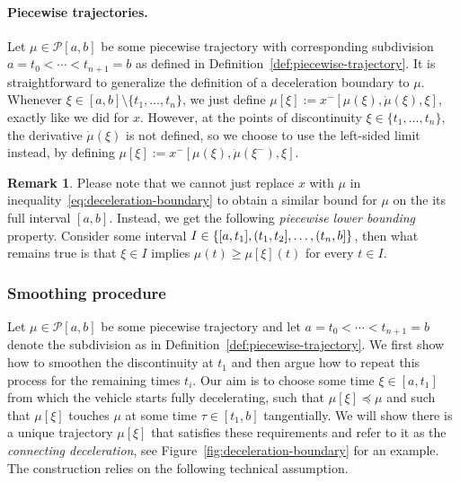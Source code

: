 \documentclass[a4paper]{article}
\theoremstyle{definition}
\newtheorem{remark}{Remark}
\theoremstyle{plain}
\begin{document}
\paragraph{Piecewise trajectories.}
Let $\mu \in \mathcal{P}[a, b]$ be some piecewise trajectory with corresponding
subdivision $a = t_{0} < \cdots < t_{n+1} = b$ as defined in Definition~\ref{def:piecewise-trajectory}. It is
straightforward to generalize the definition of a deceleration boundary to $\mu$.
%
Whenever $\xi \in [a,b] \setminus \{ t_{1}, \dots, t_{n}\}$, we just define
$\mu[\xi] := x^{-}[\mu(\xi), \dot{\mu}(\xi), \xi]$, exactly like we did for $x$.
%
However, at the points of discontinuity $\xi \in \{ t_{1}, \dots, t_{n}\}$, the
derivative $\dot{\mu}(\xi)$ is not defined, so we choose to use the left-sided limit
instead, by defining $\mu[\xi] := x^{-}[\mu(\xi), \dot{\mu}(\xi^{-}), \xi]$.

\begin{remark}\label{rem:lower-bound-piecewise}
  Please note that we cannot just replace $x$ with $\mu$ in inequality~\eqref{eq:deceleration-boundary} to
  obtain a similar bound for $\mu$ on the its full interval $[a,b]$.
  Instead, we get the following \emph{piecewise lower bounding} property.
  Consider some interval
  $I \in \{ [a, t_{1}], (t_{1},t_{2}], \dots, (t_{n},b] \}$, then what
  remains true is that $\xi \in I$ implies $\mu(t) \geq \mu[\xi](t)$ for every $t \in I$.
\end{remark}


\subsubsection{Smoothing procedure}\label{sec:smoothing}
Let $\mu \in \mathcal{P}[a,b]$ be some piecewise trajectory and let
$a = t_{0} < \cdots < t_{n+1} = b$ denote the subdivision as in Definition~\ref{def:piecewise-trajectory}.
%
We first show how to smoothen the discontinuity at $t_{1}$ and then argue how to
repeat this process for the remaining times $t_{i}$.
Our aim is to choose some time $\xi \in [a,t_{1}]$ from which the vehicle starts
fully decelerating, such that $\mu[\xi] \preceq \mu$ and such that $\mu[\xi]$ touches $\mu$ at some time
$\tau \in [t_{1}, b]$ tangentially.
%
We will show there is a unique trajectory $\mu[\xi]$ that satisfies these requirements
and refer to it as the \emph{connecting deceleration}, see
Figure~\ref{fig:deceleration-boundary} for an example.
%
The construction relies on the following technical assumption.
\end{document}
